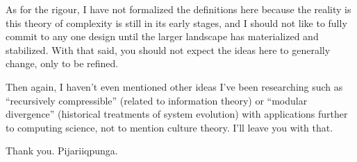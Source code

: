 \documentclass[twoside]{article}
\begin{document}
As for the rigour, I have not formalized the definitions here because the reality is this theory of complexity is still
in its early stages, and I should not like to fully commit to any one design until the larger landscape has materialized
and stabilized. With that said, you should not expect the ideas here to generally change, only to be refined.

Then again, I haven't even mentioned other ideas I've been researching such as ``recursively compressible'' (related to
information theory) or ``modular divergence'' (historical treatments of system evolution) with applications further
to computing science, not to mention culture theory. I'll leave you with that.

Thank you. Pijariiqpunga.
\end{document}
